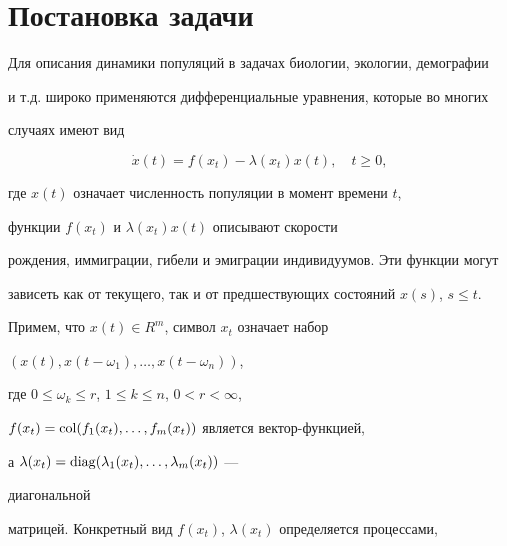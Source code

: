  


\date{} 




\pagestyle{plain} %


 




\maketitle 


\label{begin} 





\section{Постановка задачи}





Для описания динамики популяций в задачах биологии, экологии, демографии


и т.д. широко применяются дифференциальные уравнения, которые во многих


случаях имеют вид


$$


\Dot x(t) = f(x_t)-\lambda(x_t)x(t), \quad t \ge 0,


$$


где $x(t)$ означает численность популяции в момент времени $t$,


функции $f(x_t)$ и $\lambda(x_t)x(t)$ описывают скорости


рождения, иммиграции, гибели и эмиграции индивидуумов. Эти функции могут


зависеть как от текущего, так и от предшествующих состояний $x(s)$, $s\le t$.


Примем, что $x(t)\in R^m$, символ $x_t$ означает набор


$(x(t),x(t-\omega_{1}),\dotsc,x(t-\omega_n))$,


где $0\le\omega_k\le r$, $1\le k\le n$, $0<r<\infty$,


$f(x_t)=\operatorname{col}(f_1(x_t),\dotsc,f_m(x_t))$ является вектор-функцией,


а $\lambda(x_t)=\operatorname{diag}(\lambda_1(x_t),\dotsc,\lambda_m(x_t))$ ---


диагональной


матрицей. Конкретный вид $f(x_t)$, $\lambda(x_t)$ определяется процессами,


